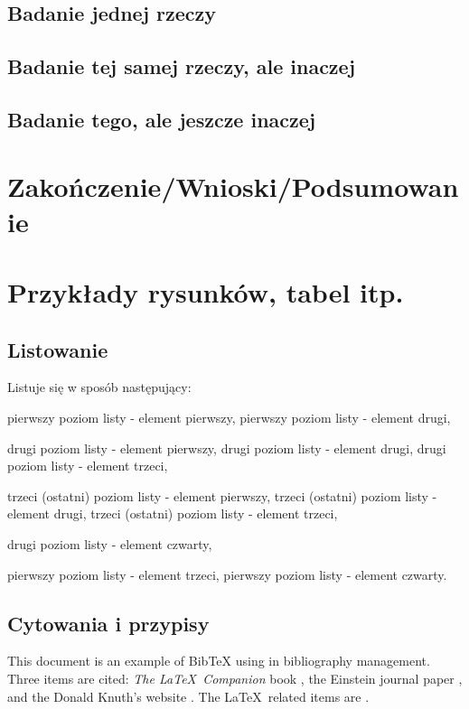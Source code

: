 \subsection{Badanie jednej rzeczy}
\lipsum[1-3]
\subsection{Badanie tej samej rzeczy, ale inaczej}
\lipsum[1-3]
\subsection{Badanie tego, ale jeszcze inaczej}
\lipsum[1-3]

\section[Zakończenie]{Zakończenie/Wnioski/Podsumowanie}
\lipsum[1-8]

\newpage
\section[Przykłady]{Przykłady rysunków, tabel itp.}
\subsection{Listowanie}
Listuje się w sposób następujący:
\begin{itemize}
	\itemi pierwszy poziom listy - element pierwszy,
	\itemi pierwszy poziom listy - element drugi,
	\begin{itemize}
		\itemii drugi poziom listy - element pierwszy,
		\itemii drugi poziom listy - element drugi,
		\itemii drugi poziom listy - element trzeci,
		\begin{itemize}
			\itemiii trzeci (ostatni) poziom listy - element pierwszy,
			\itemiii trzeci (ostatni) poziom listy - element drugi,
			\itemiii trzeci (ostatni) poziom listy - element trzeci,
		\end{itemize}
		\itemii drugi poziom listy - element czwarty,
		\end{itemize}
	\itemi pierwszy poziom listy - element trzeci,
	\itemi pierwszy poziom listy - element czwarty.
\end{itemize}

\subsection{Cytowania i przypisy}
This document is an example of BibTeX using in bibliography management. Three items
are cited: \textit{The \LaTeX\ Companion} book \cite{latexcompanion}, the Einstein
journal paper \cite{einstein}, and the Donald Knuth's website \cite{knuthwebsite}.
The \LaTeX\ related items are \cite{latexcompanion,knuthwebsite}.\footnotemark[1]

